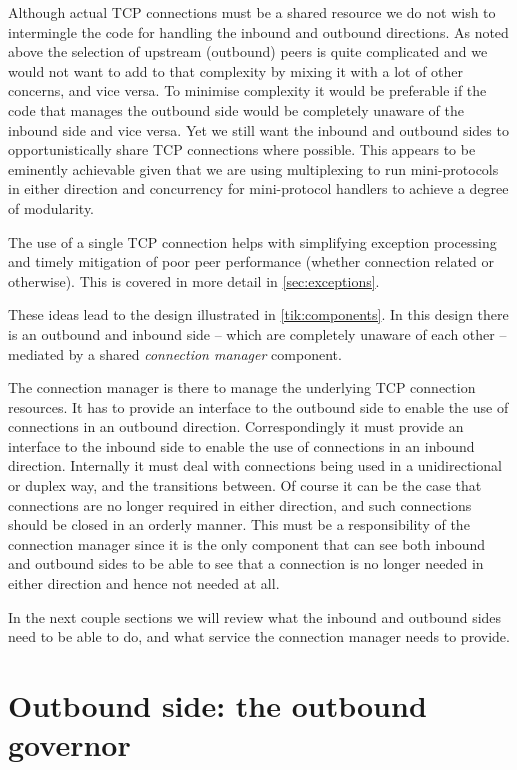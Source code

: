 Although actual TCP connections must be a shared resource we do not wish to
intermingle the code for handling the inbound and outbound directions. As noted
above the selection of upstream (outbound) peers is quite complicated and we
would not want to add to that complexity by mixing it with a lot of other
concerns, and vice versa.
To minimise complexity it would be preferable if the code that manages
the outbound side would be completely unaware of the inbound side and vice
versa. Yet we still want the inbound and outbound sides to opportunistically
share TCP connections where possible. This appears to be eminently achievable
given that we are using multiplexing to run mini-protocols in either direction
and concurrency for mini-protocol handlers to achieve a degree of modularity.

The use of a single TCP connection helps with simplifying exception processing
and timely mitigation of poor peer performance (whether connection related or
otherwise). This is covered in more detail in \cref{sec:exceptions}.

These ideas lead to the design illustrated in \cref{tik:components}. In this
design there is an outbound and inbound side -- which are completely unaware of
each other -- mediated by a shared \emph{connection manager} component.

The connection manager is there to manage the underlying TCP connection
resources. It has to provide an interface to the outbound side to enable the
use of connections in an outbound direction. Correspondingly it must provide an
interface to the inbound side to enable the use of connections in an inbound
direction. Internally it must deal with connections being used in a
unidirectional or duplex way, and the transitions between. Of course it
can be the case that connections are no longer required in either direction,
and such connections should be closed in an orderly manner. This must be a
responsibility of the connection manager since it is the only component that
can see both inbound and outbound sides to be able to see that a connection is
no longer needed in either direction and hence not needed at all.

In the next couple sections we will review what the inbound and outbound sides
need to be able to do, and what service the connection manager needs to provide.

\section{Outbound side: the outbound governor}


